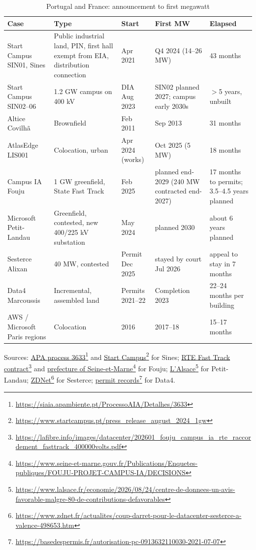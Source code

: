 \documentclass[11pt]{article}
\newcommand{\src}[2]{\href{#1}{#2}\footnote{\url{#1}}}
\begin{document}
\begin{table}[H]
\centering\small
\caption{Portugal and France: announcement to first megawatt}
\label{tab:ptfr}
\begin{tabular}{p{3.4cm}p{3.6cm}p{2.2cm}p{2.6cm}p{2.4cm}}
\toprule
Case & Type & Start & First MW & Elapsed \\
\midrule
Start Campus SIN01, Sines & Public industrial land, PIN, first hall exempt from EIA, distribution connection & Apr 2021 & Q4 2024 (14--26 MW) & 43 months \\
Start Campus SIN02--06 & 1.2 GW campus on 400 kV & DIA Aug 2023 & SIN02 planned 2027; campus early 2030s & $>$5 years, unbuilt \\
Altice Covilhã & Brownfield & Feb 2011 & Sep 2013 & 31 months \\
AtlasEdge LIS001 & Colocation, urban & Apr 2024 (works) & Oct 2025 (5 MW) & 18 months \\
Campus IA Fouju & 1 GW greenfield, State Fast Track & Feb 2025 & planned end-2029 (240 MW contracted end-2027) & 17 months to permits; 3.5--4.5 years planned \\
Microsoft Petit-Landau & Greenfield, contested, new 400/225 kV substation & May 2024 & planned 2030 & about 6 years planned \\
Sesterce Alixan & 40 MW, contested & Permit Dec 2025 & stayed by court Jul 2026 & appeal to stay in 7 months \\
Data4 Marcoussis & Incremental, assembled land & Permits 2021--22 & Completion 2023 & 22--24 months per building \\
AWS / Microsoft Paris regions & Colocation & 2016 & 2017--18 & 15--17 months \\
\bottomrule
\end{tabular}
\end{table}

Sources: \src{https://siaia.apambiente.pt/ProcessoAIA/Detalhes/3633}{APA process 3633} and \src{https://www.startcampus.pt/press_release_august_2024_1gw}{Start Campus} for Sines; \src{https://lafibre.info/images/datacenter/202601_fouju_campus_ia_rte_raccordement_fasttrack_400000volts.pdf}{RTE Fast Track contract} and \src{https://www.seine-et-marne.gouv.fr/Publications/Enquetes-publiques/FOUJU-PROJET-CAMPUS-IA/DECISIONS}{prefecture of Seine-et-Marne} for Fouju; \src{https://www.lalsace.fr/economie/2026/08/24/centre-de-donnees-un-avis-favorable-malgre-80-de-contributions-defavorables}{L'Alsace} for Petit-Landau; \src{https://www.zdnet.fr/actualites/coup-darret-pour-le-datacenter-sesterce-a-valence-498653.htm}{ZDNet} for Sesterce; \src{https://basedespermis.fr/autorisation-pc-0913632110030-2021-07-07}{permit records} for Data4.
\end{document}
